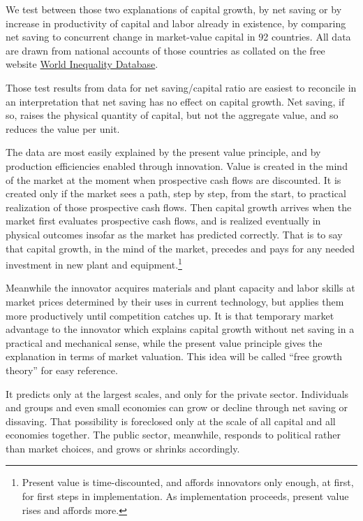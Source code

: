 \documentclass[a4paper,fleqn]{latex_styles/cas-sc}
\begin{document}
We test between those two explanations of capital growth, by net
saving or by increase in productivity of capital and labor already
in existence, by comparing net saving to concurrent change in
market-value capital in 92 countries. All data are drawn from national accounts
of those countries as collated on the free website \href{https://wid.world/}{World Inequality Database}.

Those test results from data for net saving/capital ratio 
are easiest to reconcile in an interpretation that net saving has no effect on capital growth.
Net saving, if so, raises the physical quantity of capital, but not the
aggregate value, and so reduces the value per unit.

The data are most easily explained by the present value principle,
and by production efficiencies enabled through innovation. Value is
created in the mind of the market at the moment when prospective cash
flows are discounted. It is created only if the market sees a path, step
by step, from the start, to practical realization of those prospective
cash flows. Then capital growth arrives when the market first evaluates
prospective cash flows, and is realized eventually in physical outcomes
insofar as the market has predicted correctly. That is to say that capital
growth, in the mind of the market, precedes and pays for any needed investment
in new plant and equipment.\footnote{Present value is time-discounted, and affords innovators only enough, at first, for first steps in implementation. As implementation proceeds, present value rises and affords more.}

Meanwhile the innovator
acquires materials and plant capacity and labor skills at market prices
determined by their uses in current technology, but applies them more
productively until competition catches up. It is that temporary market
advantage to the innovator which explains capital growth without net
saving in a practical and mechanical sense, while the present value
principle gives the explanation in terms of market valuation. This idea
will be called ``free growth theory'' for easy reference.

It predicts only at the largest scales, and only for the private sector.
Individuals and groups and even small economies can grow
or decline through net saving or dissaving. That possibility is foreclosed only at the
scale of all capital and all economies together. The public sector,
meanwhile, responds to political rather than market choices, and grows
or shrinks accordingly.
\end{document}

